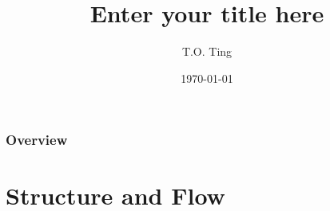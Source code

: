 \documentclass{beamer}
\title[This is for short title]{Enter your title here} %
\author{T.O. Ting} %
\institute[XJTLU] %
{ 
Xian Jiaotong-Liverpool University \\ %
\medskip
\textit{toting@xjtlu.edu.cn} %
}
\date{\today} %
\begin{document}
\begin{frame}
\titlepage %
\end{frame}

\begin{frame}
\frametitle{Overview} %
\tableofcontents %
\end{frame}






\section{Structure and Flow}
\end{document}
